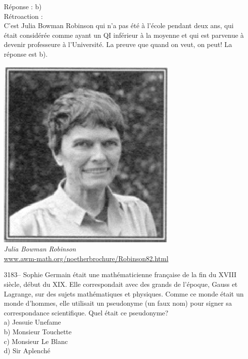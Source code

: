 \documentclass[letterpaper, 12pt]{article}
\begin{document}
R\'eponse : b)\\

R\'etroaction :\\
C'est Julia Bowman Robinson qui n'a pas \'et\'e \`a l'\'ecole pendant deux ans, qui \'etait consid\'er\'ee comme ayant un QI inf\'erieur \`a la moyenne et qui est parvenue \`a devenir professeure \`a l'Universit\'e. La preuve que quand on veut, on peut! La r\'eponse est b).
\begin{center}
\includegraphics[scale=0.75]{Robinson.eps}\\
\emph{{\small Julia Bowman Robinson}}\\
\href{http://www.awm-math.org/noetherbrochure/Robinson82.html}{www.awm-math.org/noetherbrochure/Robinson82.html}\\[5mm]
\end{center}



3183-- Sophie Germain \'etait une math\'ematicienne fran\c caise de la fin du {\scriptsize XVIII\ieme{}} si\`ecle, d\'ebut du {\scriptsize XIX\ieme{}}. Elle correspondait avec des grands de l'\'epoque, Gauss et Lagrange, sur des sujets math\'ematiques et physiques. Comme ce monde \'etait un monde d'hommes, elle utilisait un pseudonyme (un faux nom) pour signer sa correspondance scientifique. Quel \'etait ce pseudonyme?\\

a) Jessuie Unefame\\
b) Monsieur Touchette\\
c) Monsieur Le Blanc\\
d) Sir Aplench\'e\\
\end{document}
